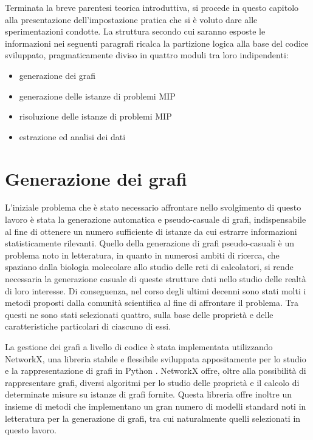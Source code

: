 {Terminata la breve parentesi teorica introduttiva,  si procede in questo capitolo alla presentazione
dell'impostazione pratica che si è voluto dare alle sperimentazioni condotte. La struttura secondo cui
saranno esposte le informazioni nei seguenti paragrafi ricalca la partizione logica alla base del codice
sviluppato, pragmaticamente diviso in quattro moduli tra loro indipendenti:}

\begin{itemize}
\item generazione dei grafi
\item generazione delle istanze di problemi MIP
\item risoluzione delle istanze di problemi MIP
\item estrazione ed analisi dei dati
\end{itemize}

\section{Generazione dei grafi}
L'iniziale problema che è stato necessario affrontare nello svolgimento di questo lavoro è stata la 
generazione automatica e pseudo-casuale di grafi, indispensabile al fine di ottenere un numero sufficiente di 
istanze da cui estrarre informazioni statisticamente rilevanti. Quello della generazione di grafi pseudo-casuali è un problema noto in letteratura, in quanto in numerosi ambiti di ricerca, che spaziano dalla biologia 
molecolare allo studio delle reti di calcolatori, si rende necessaria la generazione casuale di queste strutture 
dati nello studio delle realtà di loro interesse. 
Di conseguenza, nel corso degli ultimi decenni sono stati molti i metodi proposti dalla comunità scientifica al 
fine di affrontare il problema. Tra questi ne sono stati selezionati quattro, sulla base delle proprietà e delle caratteristiche particolari di ciascuno di essi.  

La gestione dei grafi a livello di codice è stata implementata utilizzando NetworkX, una libreria stabile e flessibile sviluppata appositamente per lo studio e la rappresentazione di grafi in Python \cite{networkx}. NetworkX offre, oltre alla possibilità di rappresentare grafi, diversi algoritmi per lo studio delle proprietà e il calcolo di determinate misure su istanze di grafi fornite. Questa libreria offre inoltre un insieme di metodi che implementano un gran numero di modelli standard noti in letteratura per la generazione di grafi, tra cui naturalmente quelli selezionati in questo lavoro. 


